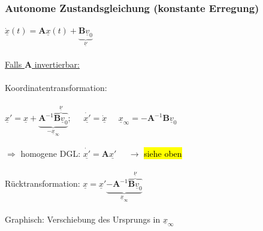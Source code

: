 \documentclass[a4paper,twocolumn,10pt]{article}
\begin{document}
\subsubsection*{Autonome Zustandsgleichung (konstante Erregung)}
$\underline{\dot{x}}(t)=\textbf{A}\underline{x}(t)+\underbrace{\textbf{B}\underline{v}_0}_{\underline{\nu}}$\\\\
\underline{Falls $\textbf{A}$ invertierbar:}\\\\
Koordinatentransformation:\\\\ $\underline{x}'=\underline{x}+\underbrace{\textbf{A}^{-1}\overbrace{\textbf{B}\underline{v}_0}^{\underline{\nu}}}_{-\underline{x}_{\infty}};\;\;\;\;\;\underline{\dot{x'}}=\underline{\dot{x}} \;\;\;\;\; \underline{x}_\infty= -\textbf{A}^{-1}\textbf{B}\underline{v}_0$\\\\
$\Rightarrow$ homogene DGL: $\underline{\dot{x'}}=\textbf{A}\underline{x'}\;\;\;\;\;\rightarrow$ \hl{siehe oben}\\\\
Rücktransformation: $\underline{x}=\underline{x}'\underbrace{-\textbf{A}^{-1} \overbrace{\textbf{B}\underline{v}_0}^{\underline{\nu}}}_{\underline{x}_{\infty}}$ \\\\
Graphisch: Verschiebung des Ursprungs in $\underline{x}_{\infty}$
\end{document}
